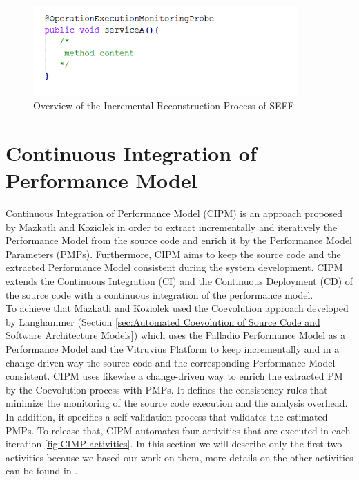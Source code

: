 \begin{figure}[h]
\centering
\includegraphics[width=0.9\textwidth]{figures/kieker-aop-img}
\caption{Overview of the Incremental Reconstruction Process of SEFF}
\label{fig:seff incremental reconst}
\end{figure}


\section{Continuous Integration of Performance Model}
\label{sec:Continuous Integration of Performance Model}
Continuous Integration of Performance Model (CIPM) is an approach proposed by Mazkatli and Koziolek \cite{mazkatli2018continuous} in order to extract incrementally and iteratively the Performance Model from the source code and enrich it by the Performance Model Parameters (PMPs). Furthermore, CIPM aims to keep the source code and the extracted Performance Model consistent during the system development. CIPM extends the Continuous Integration (CI) and the Continuous Deployment (CD) of the source code with a continuous integration of the performance model.\\ 

To achieve that Mazkatli and Koziolek used the Coevolution approach developed by Langhammer (Section \ref{sec:Automated Coevolution of Source Code and Software Architecture Models}) which uses the Palladio Performance Model as a Performance Model and the Vitruvius Platform to keep incrementally and in a change-driven way the source code and the corresponding Performance Model consistent. CIPM uses likewise a change-driven way to enrich the extracted PM by the Coevolution process with PMPs. It defines the consistency rules that minimize the monitoring of the source code execution and the analysis overhead. In addition, it specifies a self-validation process that validates the estimated PMPs. To release that, CIPM automates four activities that are executed in each iteration \ref{fig:CIMP activities}. In this section we will describe only the first two activities because we based our work on them, more details on the other activities can be found in \cite{mazkatli2018continuous}.\\

